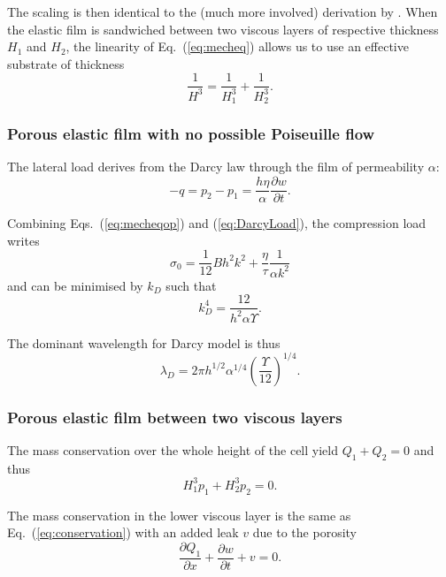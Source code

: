 \documentclass[twocolumn,superscriptaddress,showpacs,preprintnumbers,amsmath,amssymb,prl]{revtex4-1}
\begin{document}
The scaling is then identical to the (much more involved) derivation by \citet{Huang2002}. When the elastic film is sandwiched between two viscous layers of respective thickness $H_1$ and $H_2$, the linearity of Eq.~(\ref{eq:mecheq}) allows us to use an effective substrate of thickness 
\begin{equation}
\frac{1}{H^3} = \frac{1}{H_1^3}+\frac{1}{H_2^3}.
\end{equation}

\subsubsection*{Porous elastic film with no possible Poiseuille flow}
The lateral load derives from the Darcy law through the film of permeability $\alpha$:
\begin{equation}
-q = p_2-p_1 = \frac{h\eta}{\alpha}\frac{\partial w}{\partial t}.
\label{eq:DarcyLoad}
\end{equation}

Combining Eqs.~(\ref{eq:mecheqop}) and (\ref{eq:DarcyLoad}), the compression load writes
\begin{equation}
\sigma_0 = \frac{1}{12}B h^2 k^2 + \frac{\eta}{\tau}\frac{1}{\alpha k^2}
\label{eq:sigma0D}
\end{equation}
and can be minimised by $k_D$ such that
\begin{equation}
k_D^4 = \frac{12}{h^2\alpha\Upsilon}.
\label{eq:kD}
\end{equation}

The dominant wavelength for Darcy model is thus
\begin{equation}
\lambda_D = 2\pi h^{1/2}\alpha^{1/4}\left(\frac{\Upsilon}{12}\right)^{1/4}.
\end{equation}


\subsubsection*{Porous elastic film between two viscous layers}
The mass conservation over the whole height of the cell yield $Q_1 + Q_2 = 0$ and thus
\begin{equation}
H_1^3 p_1 + H_2^3 p_2 = 0.
\label{eq:pressures}
\end{equation}

The mass conservation in the lower viscous layer is the same as Eq.~(\ref{eq:conservation}) with an added leak $v$ due to the porosity
\begin{equation}
\frac{\partial Q_1}{\partial x} + \frac{\partial w}{\partial t} + v = 0.
\label{eq:conservationDarcy}
\end{equation}
\end{document}
